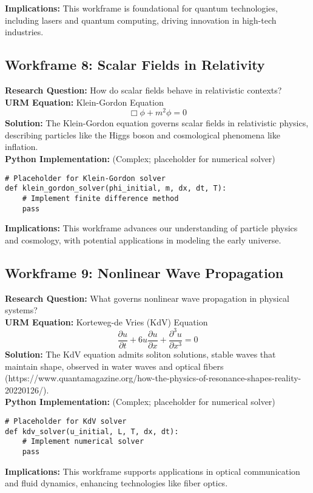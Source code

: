 \documentclass[12pt]{article}
\begin{document}
\textbf{Implications:} This workframe is foundational for quantum technologies, including lasers and quantum computing, driving innovation in high-tech industries.

\clearpage

\subsection{Workframe 8: Scalar Fields in Relativity}
\textbf{Research Question:} How do scalar fields behave in relativistic contexts? \\
\textbf{URM Equation:} Klein-Gordon Equation
\[
\Box \phi + m^2 \phi = 0
\]
\textbf{Solution:} The Klein-Gordon equation governs scalar fields in relativistic physics, describing particles like the Higgs boson and cosmological phenomena like inflation. \\
\textbf{Python Implementation:} (Complex; placeholder for numerical solver)
\begin{lstlisting}[caption={Klein-Gordon Solver Placeholder}]
# Placeholder for Klein-Gordon solver
def klein_gordon_solver(phi_initial, m, dx, dt, T):
    # Implement finite difference method
    pass
\end{lstlisting}
\textbf{Implications:} This workframe advances our understanding of particle physics and cosmology, with potential applications in modeling the early universe.

\subsection{Workframe 9: Nonlinear Wave Propagation}
\textbf{Research Question:} What governs nonlinear wave propagation in physical systems? \\
\textbf{URM Equation:} Korteweg-de Vries (KdV) Equation
\[
\frac{\partial u}{\partial t} + 6u \frac{\partial u}{\partial x} + \frac{\partial^3 u}{\partial x^3} = 0
\]
\textbf{Solution:} The KdV equation admits soliton solutions, stable waves that maintain shape, observed in water waves and optical fibers \cite{How the Physics of Resonance Shapes Reality}(https://www.quantamagazine.org/how-the-physics-of-resonance-shapes-reality-20220126/). \\
\textbf{Python Implementation:} (Complex; placeholder for numerical solver)
\begin{lstlisting}[caption={KdV Solver Placeholder}]
# Placeholder for KdV solver
def kdv_solver(u_initial, L, T, dx, dt):
    # Implement numerical solver
    pass
\end{lstlisting}
\textbf{Implications:} This workframe supports applications in optical communication and fluid dynamics, enhancing technologies like fiber optics.
\end{document}
